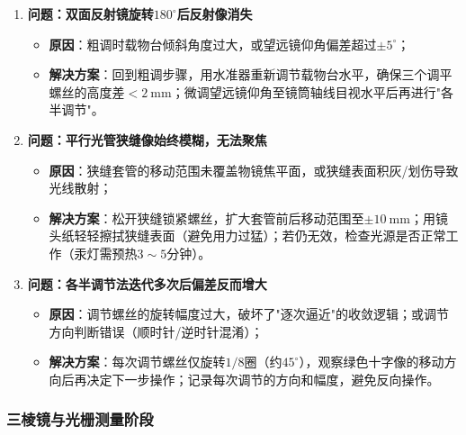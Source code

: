 \documentclass[11pt]{article}
\begin{document}
\begin{enumerate}
    \item \textbf{问题：双面反射镜旋转$180^\circ$后反射像消失}
    \begin{itemize}
        \item \textbf{原因}：粗调时载物台倾斜角度过大，或望远镜仰角偏差超过$\pm 5^\circ$；
        \item \textbf{解决方案}：回到粗调步骤，用水准器重新调节载物台水平，确保三个调平螺丝的高度差$< 2\ \text{mm}$；微调望远镜仰角至镜筒轴线目视水平后再进行"各半调节"。
    \end{itemize}
    
    \item \textbf{问题：平行光管狭缝像始终模糊，无法聚焦}
    \begin{itemize}
        \item \textbf{原因}：狭缝套管的移动范围未覆盖物镜焦平面，或狭缝表面积灰/划伤导致光线散射；
        \item \textbf{解决方案}：松开狭缝锁紧螺丝，扩大套管前后移动范围至$\pm 10\ \text{mm}$；用镜头纸轻轻擦拭狭缝表面（避免用力过猛）；若仍无效，检查光源是否正常工作（汞灯需预热$3 \sim 5$分钟）。
    \end{itemize}
    
    \item \textbf{问题：各半调节法迭代多次后偏差反而增大}
    \begin{itemize}
        \item \textbf{原因}：调节螺丝的旋转幅度过大，破坏了"逐次逼近"的收敛逻辑；或调节方向判断错误（顺时针/逆时针混淆）；
        \item \textbf{解决方案}：每次调节螺丝仅旋转$1/8$圈（约$45^\circ$），观察绿色十字像的移动方向后再决定下一步操作；记录每次调节的方向和幅度，避免反向操作。
    \end{itemize}
\end{enumerate}

\subsubsection{三棱镜与光栅测量阶段}
\end{document}
